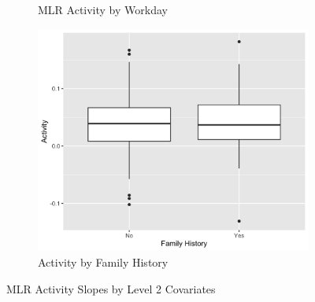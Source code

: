 \documentclass[12pt,twoside,leqno,fleqn,letterpaper]{article}
\theoremstyle{definition}
\theoremstyle{definition}
\begin{document}
\begin{figure}
\begin{subfigure}[b]{0.32\textwidth}
            \caption[]%
            {{\small MLR Activity by Workday}}
            \label{fig: act v day}
            \end{subfigure}
            \hfill
            \begin{subfigure}[b]{0.32\textwidth}
            \centering
            \includegraphics[width=\textwidth]{pics/mlr act by fh.png}
            \caption[]%
            {{\small Activity by Family History}}
            \label{fig: act v fh}
            \end{subfigure}
            \caption[]
            {\small MLR Activity Slopes by Level 2 Covariates}
            \label{fig: act v lv2}
            \end{figure}
\end{document}
